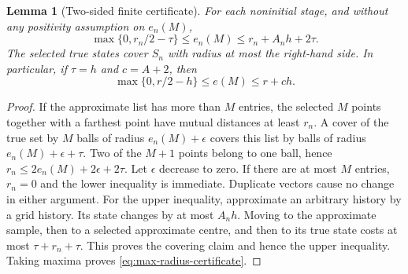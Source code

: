 \documentclass[11pt]{amsart}
\newtheorem{lemma}[theorem]{Lemma}
\theoremstyle{definition}\newtheorem{definition}[theorem]{Definition}
\theoremstyle{remark}\newtheorem{remark}[theorem]{Remark}
\begin{document}
\begin{lemma}[Two-sided finite certificate]\label{lem:radius-certificate}
For each noninitial stage, and without any positivity assumption on
$e_n(M)$,
\begin{equation}\label{eq:radius-certificate}
 \max\{0,r_n/2-\tau\}\le e_n(M)
                   \le r_n+A_nh+2\tau.
\end{equation}
The selected true states cover $S_n$ with radius at most the right-hand
side. In particular, if $\tau=h$ and $c=A+2$, then
\begin{equation}\label{eq:max-radius-certificate}
 \max\{0,r/2-h\}\le e(M)\le r+ch.
\end{equation}
\end{lemma}
\begin{proof}
If the approximate list has more than $M$ entries, the selected $M$
points together with a farthest point have mutual distances at least
$r_n$. A cover of the true set by $M$ balls of radius $e_n(M)+\epsilon$
covers this list by balls of radius $e_n(M)+\epsilon+\tau$.
Two of the $M+1$ points belong to one ball, hence
$r_n\le2e_n(M)+2\epsilon+2\tau$. Let $\epsilon$ decrease to zero.
If there are at most $M$ entries, $r_n=0$ and the lower inequality is
immediate. Duplicate vectors cause no change in either argument.
For the upper inequality, approximate an arbitrary history by a grid
history. Its state changes by at most $A_nh$. Moving to the approximate
sample, then to a selected approximate centre, and then to its true
state costs at most $\tau+r_n+\tau$. This proves the covering claim
and hence the upper inequality. Taking maxima proves
\eqref{eq:max-radius-certificate}.
\end{proof}
\end{document}
